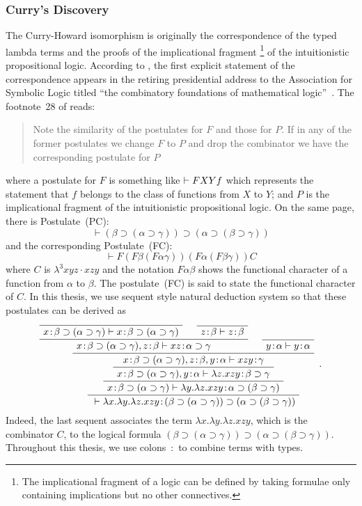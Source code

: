 \subsubsection{Curry's Discovery}
The Curry-Howard isomorphism is originally the correspondence of
the typed lambda terms and the proofs of the implicational fragment%
 \footnote{The implicational fragment of a
 logic can be defined by taking formulae only containing implications
 but no other connectives.} of
the intuitionistic propositional logic.
According to \citep{curryhoward}, the first explicit statement of the
correspondence appears
in the retiring presidential address to the Association for Symbolic
Logic titled ``the combinatory foundations of mathematical
logic''~\cite{curry1942}.
The footnote~28 of \citep{curry1942} reads:
 \begin{quote}
  Note the similarity of the postulates for $F$ and those for $P$.  If
  in any of the former postulates we change $F$ to $P$ and drop the
  combinator we have the corresponding postulate for $P$
 \end{quote}
 where a postulate for $F$ is something like $\vdash F X Y f$ which
 represents the statement that $f$ belongs to the
 class of functions from $X$ to $Y$; and $P$ is the implicational
 fragment of the intuitionistic propositional logic.
 On the same page, there is Postulate~(PC):
\[
 \vdash (\beta\supset (\alpha\supset \gamma))\supset (\alpha \supset
 (\beta\supset \gamma))
\]
and the corresponding Postulate~(FC):
\[
 \vdash F(F\beta(F\alpha\gamma))(F\alpha(F\beta\gamma))C
\]
 where $C$ is $\lambda^3 xyz\cdot xzy$ and the notation $F\alpha\beta$
 shows the
 functional character of a
 function from $\alpha$ to $\beta$.  The postulate~(FC) is said to
 state the functional character of $C$.
 In this thesis, we use sequent style natural deduction system so that these
 postulates can be derived as
 \[
 \AxiomC{}
 \useq{\tj{x}{\beta\supset (\alpha\supset \gamma)}}{\tj{x}{\beta\supset
 (\alpha\supset \gamma)}}
 \AxiomC{}
 \useq{\tj{z}{\beta}}{\tj{z}{\beta}}
 \bseq{\tj{x}{\beta\supset (\alpha\supset \gamma)},
 \tj{z}{\beta}}{\tj{xz}{\alpha\supset\gamma}}
 \AxiomC{}
 \useq{\tj{y}{\alpha}}{\tj{y}{\alpha}}
 \bseq{\tj{x}{\beta\supset (\alpha\supset \gamma)},
 \tj{z}{\beta},\tj{y}{\alpha}}{\tj{xzy}{\gamma}}
 \useq{\tj{x}{\beta\supset (\alpha\supset
 \gamma)},\tj{y}{\alpha}}{\tj{\lambda z. xzy}{\beta\supset\gamma}}
 \useq{\tj{x}{\beta\supset (\alpha\supset
 \gamma)}}{\tj{\lambda y.\lambda z. xzy}{\alpha\supset(\beta\supset\gamma)}}
 \useq{}{\tj{\lambda x.\lambda y.\lambda z. xzy}{{(\beta\supset (\alpha\supset
 \gamma))}\supset (\alpha\supset(\beta\supset\gamma))}}
 \DisplayProof \enspace .
 \]
 Indeed, the last sequent associates the term $\lambda x.\lambda
 y.\lambda z. xzy$, which is the combinator $C$, to the logical formula
 $(\beta\supset (\alpha\supset
 \gamma))\supset (\alpha\supset(\beta\supset\gamma))$.
 Throughout this thesis, we use colons~$\colon$ to combine terms with types.


